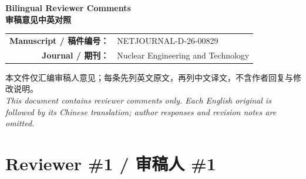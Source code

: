 \documentclass[11pt,a4paper,twoside]{article}
\begin{document}
\begin{center}
  {\LARGE\bfseries Bilingual Reviewer Comments}\\[0.35em]
  {\LARGE\bfseries 审稿意见中英对照}\\[0.9em]
  \begin{tabular}{@{}rl@{}}
    \textbf{Manuscript / 稿件编号：} & NETJOURNAL-D-26-00829 \\
    \textbf{Journal / 期刊：} & Nuclear Engineering and Technology \\
  \end{tabular}
\end{center}

\vspace{0.55em}
\begin{tcolorbox}[colback=white,colframe=rulegray,boxrule=0.45pt,arc=1mm,left=2mm,right=2mm,top=1.5mm,bottom=1.5mm]
\small 本文件仅汇编审稿人意见；每条先列英文原文，再列中文译文，不含作者回复与修改说明。\\
\textit{This document contains reviewer comments only. Each English original is followed by its Chinese translation; author responses and revision notes are omitted.}
\end{tcolorbox}

\tableofcontents
\clearpage
{}
\section{Reviewer \#1 / 审稿人 \#1}
\end{document}
